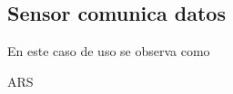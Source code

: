\subsection{Sensor comunica datos}

\par En este caso de uso se observa como

\begin{umlsystem}[x=4, fill=green!10]{ARS}
\end{umlsystem}

